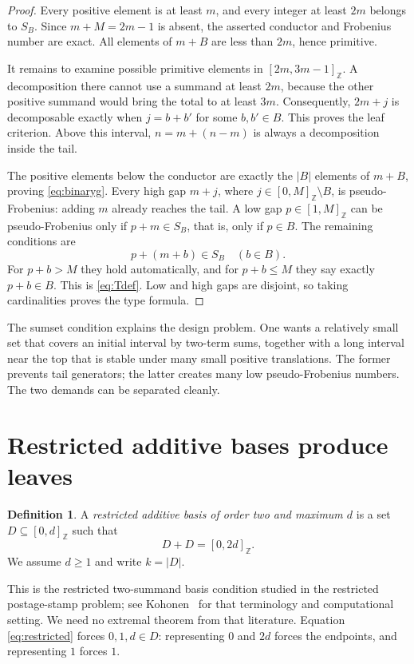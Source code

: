 \documentclass[11pt,letterpaper]{article}
\numberwithin{equation}{section}
\theoremstyle{definition}
\newtheorem{definition}[theorem]{Definition}
\theoremstyle{remark}
\newcommand{\Z}{\mathbb Z}
\newcommand{\ints}[2]{[#1,#2]_{\Z}}
\begin{document}
\begin{proof}
Every positive element is at least $m$, and every integer at least $2m$
belongs to $S_B$. Since $m+M=2m-1$ is absent, the asserted conductor and
Frobenius number are exact. All elements of $m+B$ are less than $2m$, hence
primitive.

It remains to examine possible primitive elements in
$\ints{2m}{3m-1}$. A decomposition there cannot use a summand at least $2m$,
because the other positive summand would bring the total to at least $3m$.
Consequently, $2m+j$ is decomposable exactly when
$j=b+b'$ for some $b,b'\in B$. This proves the leaf criterion. Above this
interval, $n=m+(n-m)$ is always a decomposition inside the tail.

The positive elements below the conductor are exactly the $|B|$ elements
of $m+B$, proving \eqref{eq:binaryg}. Every high gap
$m+j$, where $j\in\ints{0}{M}\setminus B$, is pseudo-Frobenius: adding
$m$ already reaches the tail. A low gap $p\in\ints{1}{M}$ can be
pseudo-Frobenius only if $p+m\in S_B$, that is, only if $p\in B$.
The remaining conditions are
\[
 p+(m+b)\in S_B\quad(b\in B).
\]
For $p+b>M$ they hold automatically, and for $p+b\le M$ they say exactly
$p+b\in B$. This is \eqref{eq:Tdef}. Low and high gaps are disjoint,
so taking cardinalities proves the type formula.
\end{proof}

The sumset condition explains the design problem. One wants a relatively
small set that covers an initial interval by two-term sums, together with a
long interval near the top that is stable under many small positive
translations. The former prevents tail generators; the latter creates many
low pseudo-Frobenius numbers. The two demands can be separated cleanly.

\section{Restricted additive bases produce leaves}\label{sec:basis}

\begin{definition}
A \emph{restricted additive basis of order two and maximum $d$} is a set
$D\subseteq\ints{0}{d}$ such that
\begin{equation}\label{eq:restricted}
 D+D=\ints{0}{2d}.
\end{equation}
We assume $d\ge1$ and write $k=|D|$.
\end{definition}

This is the restricted two-summand basis condition studied in the restricted
postage-stamp problem; see Kohonen~\cite{Kohonen} for that terminology and
computational setting. We need no extremal theorem from that literature.
Equation \eqref{eq:restricted} forces $0,1,d\in D$: representing $0$ and
$2d$ forces the endpoints, and representing $1$ forces $1$.
\end{document}
